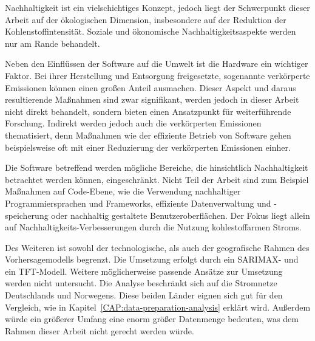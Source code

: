 Nachhaltigkeit ist ein vielschichtiges Konzept, jedoch liegt der Schwerpunkt dieser Arbeit auf der ökologischen Dimension, insbesondere auf der Reduktion der Kohlenstoffintensität.
Soziale und ökonomische Nachhaltigkeitsaspekte werden nur am Rande behandelt.

Neben den Einflüssen der Software auf die Umwelt ist die Hardware ein wichtiger Faktor.
Bei ihrer Herstellung und Entsorgung freigesetzte, sogenannte verkörperte Emissionen können einen großen Anteil ausmachen.
Dieser Aspekt und daraus resultierende Maßnahmen sind zwar signifikant, werden jedoch in dieser Arbeit nicht direkt behandelt, sondern bieten einen Ansatzpunkt für weiterführende Forschung.
Indirekt werden jedoch auch die verkörperten Emissionen thematisiert, denn Maßnahmen wie der effiziente Betrieb von Software gehen beispielsweise oft mit einer Reduzierung der verkörperten Emissionen einher.

Die Software betreffend werden mögliche Bereiche, die hinsichtlich Nachhaltigkeit betrachtet werden können, eingeschränkt.
Nicht Teil der Arbeit sind zum Beispiel Maßnahmen auf Code-Ebene, wie die Verwendung nachhaltiger Programmiersprachen und Frameworks, effiziente Datenverwaltung und -speicherung oder nachhaltig gestaltete Benutzeroberflächen.
Der Fokus liegt allein auf Nachhaltigkeits-Verbesserungen durch die Nutzung kohlestoffarmen Stroms.


Des Weiteren ist sowohl der technologische, als auch der geografische Rahmen des Vorhersagemodells begrenzt.
Die Umsetzung erfolgt durch ein \ac{SARIMAX}- und ein \ac{TFT}-Modell.
Weitere möglicherweise passende Ansätze zur Umsetzung werden nicht untersucht.
Die Analyse beschränkt sich auf die Stromnetze Deutschlands und Norwegens.
Diese beiden Länder eignen sich gut für den Vergleich, wie in Kapitel~\ref{CAP:data-preparation-analysis} erklärt wird.
Außerdem würde ein größerer Umfang eine enorm größer Datenmenge bedeuten, was dem Rahmen dieser Arbeit nicht gerecht werden würde.

